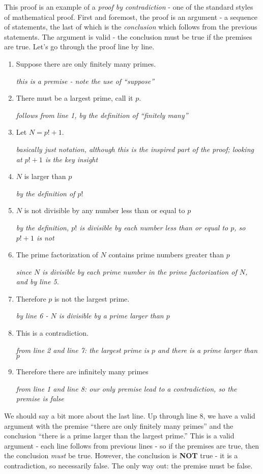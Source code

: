\documentclass[12pt]{article}
\begin{document}
 This proof is an example of a {\em proof by contradiction} - one of the standard styles of mathematical proof.  First and foremost, the proof is an argument - a sequence of statements, the last of which is the {\em conclusion} which follows from the previous statements.  The argument is valid - the conclusion must be true if the premises are true.  Let's go through the proof line by line.
 
 \begin{enumerate}
  \item Suppose there are only finitely many primes.
 
 \hfill{\em this is a premise - note the use of ``suppose''}
 \item  There must be a largest prime, call it $p$. 
 
 \hfill{\em follows from line 1, by the definition of ``finitely many''}
 \item Let $N = p! + 1$.
 
 \hfill {\em basically just notation, although this is the inspired part of the proof; looking at $p! + 1$ is the key insight}
 \item $N$ is larger than $p$
 
 \hfill {\em by the definition of $p!$}
 \item $N$ is not divisible by any number less than or equal to $p$ 
 
 \hfill {\em by the definition, $p!$ is divisible by each number less than or equal to $p$, so $p! + 1$ is not}
 \item The prime factorization of $N$ contains prime numbers greater than $p$ 
 
 \hfill {\em since $N$ is divisible by each prime number in the prime factorization of $N$, and by line 5.}
 \item Therefore $p$ is not the largest prime.
 
 \hfill {\em by line 6 - $N$ is divisible by a prime larger than $p$}
 \item This is a contradiction.
 
 \hfill {\em from line 2 and line 7: the largest prime is $p$ and there is a prime larger than $p$}
 \item Therefore there are infinitely many primes
 
 \hfill {\em from line 1 and line 8: our only premise lead to a contradiction, so the premise is false}
 \end{enumerate}
 
 We should say a bit more about the last line.  Up through line 8, we have a valid argument with the premise ``there are only finitely many primes'' and the conclusion ``there is a prime larger than the largest prime.''  This is a valid argument - each line follows from previous lines - so if the premises are true, then the conclusion \emph{must} be true.  However, the conclusion is \textbf{NOT} true - it is a contradiction, so necessarily false.  The only way out: the premise must be false.  
 
\end{document}

